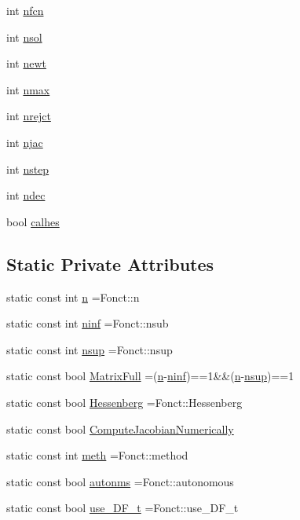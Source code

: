 \begin{DoxyCompactItemize}
\item 
int \hyperlink{classodes_1_1Rodascc_a865d72e57126133f90bcd81c6b045172}{nfcn}
\item 
int \hyperlink{classodes_1_1Rodascc_a6c7de966dfd6d284946c4827d0772b53}{nsol}
\item 
int \hyperlink{classodes_1_1Rodascc_a66dcc7f2616b26cdf336361b35283885}{newt}
\item 
int \hyperlink{classodes_1_1Rodascc_a3403627bcfb7adb71ba01d2a3e2e524a}{nmax}
\item 
int \hyperlink{classodes_1_1Rodascc_a403281ba410e533ce97115ed38e7625c}{nrejct}
\item 
int \hyperlink{classodes_1_1Rodascc_aaf5ff60c85f52ed4b4431a00e2782e83}{njac}
\item 
int \hyperlink{classodes_1_1Rodascc_af85ccdddfcc356ca9cdf2f2520f79450}{nstep}
\item 
int \hyperlink{classodes_1_1Rodascc_a55cb51362c70bff92caeff3609b06454}{ndec}
\item 
bool \hyperlink{classodes_1_1Matrices_a82e935680c27f58bcff8a559700411c6}{calhes}
\end{DoxyCompactItemize}
\subsection*{Static Private Attributes}
\begin{DoxyCompactItemize}
\item 
static const int \hyperlink{classodes_1_1Rodascc_a7a4cb0d10f0154fed837031863bb491d}{n} =Fonct\-::n
\item 
static const int \hyperlink{classodes_1_1Rodascc_a72b21cd42a31626c76d828b56ba50c7f}{ninf} =Fonct\-::nsub
\item 
static const int \hyperlink{classodes_1_1Rodascc_a94122fb8af91d10037aa1206765cfcef}{nsup} =Fonct\-::nsup
\item 
static const bool \hyperlink{classodes_1_1Rodascc_a6fb3605e3784360a5cc4519dbb72464e}{Matrix\-Full} =(\hyperlink{classodes_1_1Rodascc_a7a4cb0d10f0154fed837031863bb491d}{n}-\/\hyperlink{classodes_1_1Rodascc_a72b21cd42a31626c76d828b56ba50c7f}{ninf})==1\&\&(\hyperlink{classodes_1_1Rodascc_a7a4cb0d10f0154fed837031863bb491d}{n}-\/\hyperlink{classodes_1_1Rodascc_a94122fb8af91d10037aa1206765cfcef}{nsup})==1
\item 
static const bool \hyperlink{classodes_1_1Rodascc_ab0e70822d886ddc3019ffa890e38cbfc}{Hessenberg} =Fonct\-::\-Hessenberg
\item 
static const bool \hyperlink{classodes_1_1Rodascc_a7cceb1b3012e27031d1636af2fcb71df}{Compute\-Jacobian\-Numerically}
\item 
static const int \hyperlink{classodes_1_1Rodascc_a00163c374fb9d95e240c696a4b764984}{meth} =Fonct\-::method
\item 
static const bool \hyperlink{classodes_1_1Rodascc_ab1265c0c702209400960dd5dc51259af}{autonms} =Fonct\-::autonomous
\item 
static const bool \hyperlink{classodes_1_1Rodascc_a6b5e12269c7ab02716bb18a61082061b}{use\-\_\-\-D\-F\-\_\-t} =Fonct\-::use\-\_\-\-D\-F\-\_\-t
\end{DoxyCompactItemize}


